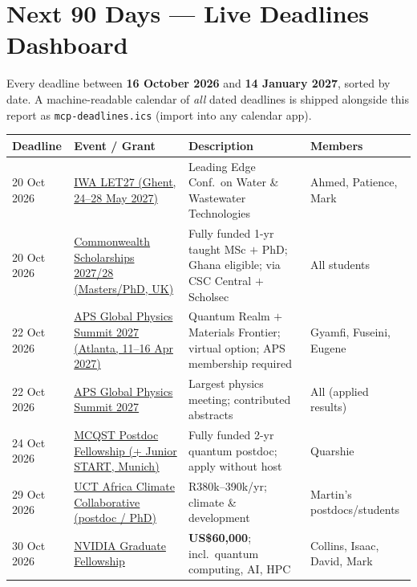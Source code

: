 \section{Next 90 Days --- Live Deadlines Dashboard}

\noindent Every deadline between \textbf{16 October 2026} and \textbf{14 January 2027}, sorted by date. A machine-readable calendar of \emph{all} dated deadlines is shipped alongside this report as \texttt{mcp-deadlines.ics} (import into any calendar app).

\begin{longtable}{@{}p{2.0cm}p{4.4cm}p{5.2cm}p{3.0cm}@{}}
\toprule
\textbf{Deadline} & \textbf{Event / Grant} & \textbf{Description} & \textbf{Members} \\
\midrule
\endhead
20 Oct 2026 & \href{https://ebnet.ac.uk/iwa-let27-abstracts-deadline/}{IWA LET27 (Ghent, 24--28 May 2027)} & Leading Edge Conf.\ on Water \& Wastewater Technologies & Ahmed, Patience, Mark  \\
\midrule
20 Oct 2026 & \href{https://cscuk.fcdo.gov.uk/scholarships}{Commonwealth Scholarships 2027/28 (Masters/PhD, UK)} & Fully funded 1-yr taught MSc $+$ PhD; Ghana eligible; via CSC Central $+$ Scholsec & All students  \\
\midrule
22 Oct 2026 & \href{https://summit.aps.org/attend/abstracts}{APS Global Physics Summit 2027 (Atlanta, 11--16 Apr 2027)} & Quantum Realm $+$ Materials Frontier; virtual option; APS membership required & Gyamfi, Fuseini, Eugene  \\
\midrule
22 Oct 2026 & \href{https://summit.aps.org/attend/abstracts/}{APS Global Physics Summit 2027} & Largest physics meeting; contributed abstracts & All (applied results)  \\
\midrule
24 Oct 2026 & \href{https://www.mcqst.de/support/postdoctoral-programs/postdoc-fellowship.html}{MCQST Postdoc Fellowship (+ Junior START, Munich)} & Fully funded 2-yr quantum postdoc; apply without host & Quarshie  \\
\midrule
29 Oct 2026 & \href{https://acdi.uct.ac.za/africaclimatecollaborative/postdoctoral-research-fellowships-climate-and-development}{UCT Africa Climate Collaborative (postdoc / PhD)} & R380k--390k/yr; climate \& development & Martin's postdocs/students  \\
\midrule
30 Oct 2026 & \href{https://research.nvidia.com/graduate-fellowships}{NVIDIA Graduate Fellowship} & \textbf{US\$60{,}000}; incl.\ quantum computing, AI, HPC & Collins, Isaac, David, Mark  \\

\end{longtable}
